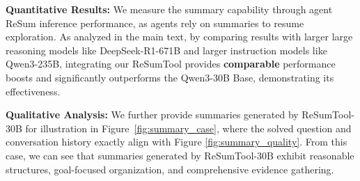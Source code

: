 \textbf{Quantitative Results:} We measure the summary capability through agent ReSum inference performance, as agents rely on summaries to resume exploration. As analyzed in the main text, by comparing results with larger large reasoning models like DeepSeek-R1-671B and larger instruction models like Qwen3-235B, integrating our ReSumTool provides \textbf{comparable} performance boosts and significantly outperforms the Qwen3-30B Base, demonstrating its effectiveness.

\textbf{Qualitative Analysis:} We further provide summaries generated by ReSumTool-30B for illustration in Figure~\ref{fig:summary_case}, where the solved question and conversation history exactly align with Figure \ref{fig:summary_quality}. From this case, we can see that summaries generated by ReSumTool-30B exhibit reasonable structures, goal-focused organization, and comprehensive evidence gathering.
